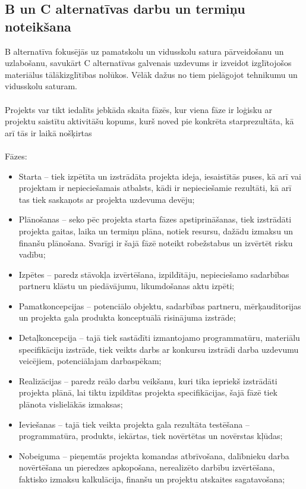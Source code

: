 \subsection{B un C alternatīvas darbu un termiņu noteikšana}
B alternatīva fokusējās uz pamatskolu un vidusskolu satura pārveidošanu un uzlabošanu, savukārt C alternatīvas
galvenais uzdevums ir izveidot izglītojošos materiālus tālākizglītības nolūkos. Vēlāk dažus no tiem pielāgojot
tehnikumu un vidusskolu saturam.
\paragraph{}
Projekts var tikt iedalīts jebkāda skaita fāzēs, kur viena fāze ir
loģisku ar projektu saistītu aktivitāšu kopums, kurš noved pie konkrēta starprezultāta, kā arī tās ir
laikā nošķirtas %
\paragraph{}
Fāzes:
\begin{itemize}
    \item Starta – tiek izpētīta un izstrādāta projekta ideja, iesaistītās puses, kā arī vai projektam ir
    nepieciešamais atbalsts, kādi ir nepieciešamie rezultāti, kā arī tas tiek saskaņots ar projekta
    uzdevuma devēju;
    \item Plānošanas – seko pēc projekta starta fāzes apstiprināšanas, tiek izstrādāti projekta
    gaitas, laika un termiņu plāna, notiek resursu, dažādu izmaksu un finanšu plānošana. Svarīgi
    ir šajā fāzē noteikt robežstabus un izvērtēt risku vadību;
    \item Izpētes – paredz stāvokļa izvērtēšana, izpildītāju, nepieciešamo sadarbības partneru
    klāstu un piedāvājumu, likumdošanas aktu izpēti;
    \item Pamatkoncepcijas – potenciālo objektu, sadarbības partneru, mērķauditorijas un
    projekta gala produkta konceptuālā risinājuma izstrāde;
    \item Detaļkoncepcija – tajā tiek sastādīti izmantojamo programmatūru, materiālu specifikāciju
    izstrāde, tiek veikts darbs ar konkursu izstrādi darba uzdevumu veicējiem, potenciālajam
    darbaspēkam;
    \item Realizācijas – paredz reālo darbu veikšanu, kuri tika iepriekš izstrādāti projekta
    plānā, lai tiktu izpildītas projekta specifikācijas, šajā fāzē tiek plānota vislielākās izmaksas;
    \item Ieviešanas – tajā tiek veikta projekta gala rezultāta testēšana – programmatūra,
    produkts, iekārtas, tiek novērtētas un novērstas kļūdas;
    \item Nobeiguma – pieņemtās projekta komandas atbrīvošana, dalībnieku darba novērtēšana
    un pieredzes apkopošana, nerealizēto darbību izvērtēšana, faktisko izmaksu kalkulācija,
    finanšu un projektu atskaites sagatavošana;
\end{itemize}
